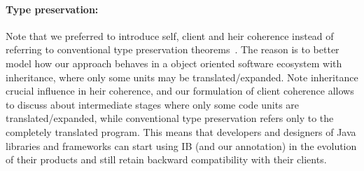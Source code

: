 \paragraph{Type preservation:}
Note that we preferred to introduce self, client and heir coherence instead of referring to conventional
type preservation theorems~\cite{}. The reason is
to better model how our approach behaves in a object oriented software ecosystem with inheritance,
where only some units may be translated/expanded.
Note inheritance crucial influence in heir coherence, and 
our formulation of client coherence allows to discuss about intermediate
stages where only some code units are translated/expanded, while conventional 
type preservation refers only to the completely translated program.
This means that developers and designers of Java libraries and frameworks
can start using IB (and our \mixin annotation) in the evolution of their products
and still retain backward compatibility with their clients.


\begin{comment}
\begin{figure}[tbp]
\centering
\texttt{[image: screenshot.png]}
\caption{Screenshot.}\label{screenshot_png}
\end{figure}

\haoyuan{I tried to understand the current algorithm, and did more experiments in eclipse.
Now I borrow some ideas from the current version, and give a new version of the algorithm in text. See below.

(1) I guess the function \textsf{tops} is not necessary. The first step is still
\[\textsf{mbody}(m,C_i)\in\overline{meth}\textrm{ (excluding \textbf{static} methods)}\]

(2) Assume the context is ``interface $C_0$ extends $\overline{C}$ \{$meth'$;...\}''. First handle
\[\textsf{override}(meth',\overline{meth}) \eqno{(*)}\]

(3) If $meth'\ne\none$, $(*)$ returns $meth'$ if
\[\forall meth\in\overline{meth},meth'\subtype meth\]
even if there are conflicts in $\overline{meth}$.

(4) If $meth'=\none$, we need to figure out
\[\textsf{mostSpecific}(\overline{meth})\]
and it should be the one that ``overrides'' all the others in $\overline{meth}$. It means we should not only deal with the return types of methods, but also look into the subtyping relation of interfaces. But for abstract methods, only return types are taken into consideration.
}
\end{comment}


